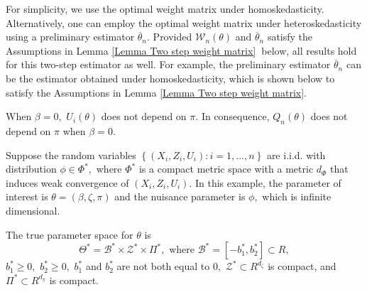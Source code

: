 \documentclass[12pt,titlepage,final,oneside,letterpaper]{article}
\begin{document}
For simplicity, we use the optimal weight matrix under homoskedasticity.
Alternatively, one can employ the optimal weight matrix under
heteroskedasticity using a preliminary estimator $\overline{\theta }_{n}.$
Provided $\mathcal{W}_{n}(\theta )$ and $\overline{\theta }_{n}$ satisfy the
Assumptions in Lemma \ref{Lemma Two step weight matrix}\textbf{\ }below, all
results hold for this two-step estimator as well. For example, the
preliminary estimator $\overline{\theta }_{n}$ can be the estimator obtained
under homoskedasticity, which is shown below to satisfy the Assumptions in
Lemma \ref{Lemma Two step weight matrix}.

When $\beta =0,$ $U_{i}(\theta )$ does not depend on $\pi .$ In consequence, 
$Q_{n}(\theta )$ does not depend on $\pi $ when $\beta =0.$

Suppose the random variables $\left\{ \left( X_{i},Z_{i},U_{i}\right)
:i=1,...,n\right\} $ are i.i.d. with distribution $\phi \in \Phi ^{\ast },$
where $\Phi ^{\ast }$ is a compact metric space with a metric $d_{\Phi }$
that induces weak convergence of $(X_{i},Z_{i},U_{i}).$ In this example, the
parameter of interest is $\theta =(\beta ,\zeta ,\pi )$ and the nuisance
parameter is $\phi ,$ which is infinite dimensional.

The true parameter space for $\theta $ is%
\begin{equation}
\Theta ^{\ast }=\mathcal{B}^{\ast }\times \mathcal{Z}^{\ast }\times \Pi
^{\ast },\text{ where }\mathcal{B}^{\ast }=[-b_{1}^{\ast },b_{2}^{\ast
}]\subset R,  \label{gmm theta space}
\end{equation}%
$b_{1}^{\ast }\geq 0,$ $b_{2}^{\ast }\geq 0,$ $b_{1}^{\ast }$ and $%
b_{2}^{\ast }$ are not both equal to $0,$ $\mathcal{Z}^{\ast }\subset
R^{d_{\zeta }}$ is compact, and $\Pi ^{\ast }\subset R^{d_{\pi }}$ is
compact.
\end{document}
